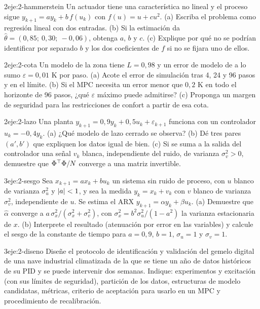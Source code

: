 \begin{ejercicio}{2}{eje:2-hammerstein}
Un actuador tiene una característica no lineal y el proceso sigue $y_{k+1}=ay_k+b\,f(u_k)$ con $f(u)=u+cu^{2}$. (a) Escriba el problema como regresión lineal con dos entradas. (b) Si la estimación da $\hat\theta=(0{,}85;\ 0{,}30;\ -0{,}06)$, obtenga $a$, $b$ y $c$. (c) Explique por qué no se podrían identificar por separado $b$ y los dos coeficientes de $f$ si no se fijara uno de ellos.
\end{ejercicio}

\begin{ejercicio}{2}{eje:2-cota}
Un modelo de la zona tiene $L=0{,}98$ y un error de modelo de a lo sumo $\varepsilon=0{,}01$ K por paso. (a) Acote el error de simulación tras 4, 24 y 96 pasos y en el límite. (b) Si el MPC necesita un error menor que $0{,}2$ K en todo el horizonte de 96 pasos, ¿qué $\varepsilon$ máximo puede admitirse? (c) Proponga un margen de seguridad para las restricciones de confort a partir de esa cota.
\end{ejercicio}

\begin{ejercicio}{2}{eje:2-lazo}
Una planta $y_{k+1}=0{,}9y_k+0{,}5u_k+\varepsilon_{k+1}$ funciona con un controlador $u_k=-0{,}4y_k$. (a) ¿Qué modelo de lazo cerrado se observa? (b) Dé tres pares $(a',b')$ que expliquen los datos igual de bien. (c) Si se suma a la salida del controlador una señal $v_k$ blanca, independiente del ruido, de varianza $\sigma_v^{2}>0$, demuestre que $\Phi^{\top}\Phi/N$ converge a una matriz invertible.
\end{ejercicio}

\begin{ejercicio}{3}{eje:2-sesgo}
Sea $x_{k+1}=ax_k+bu_k$ un sistema sin ruido de proceso, con $u$ blanco de varianza $\sigma_u^{2}$ y $\lvert a\rvert<1$, y sea la medida $y_k=x_k+v_k$ con $v$ blanco de varianza $\sigma_v^{2}$, independiente de $u$. Se estima el ARX $y_{k+1}=\alpha y_k+\beta u_k$. (a) Demuestre que $\hat\alpha$ converge a $a\,\sigma_x^{2}/(\sigma_x^{2}+\sigma_v^{2})$, con $\sigma_x^{2}=b^{2}\sigma_u^{2}/(1-a^{2})$ la varianza estacionaria de $x$. (b) Interprete el resultado (atenuación por error en las variables) y calcule el sesgo de la constante de tiempo para $a=0{,}9$, $b=1$, $\sigma_u=1$ y $\sigma_v=1$.
\end{ejercicio}

\begin{ejercicio}{3}{eje:2-diseno}
Diseñe el protocolo de identificación y validación del gemelo digital de una nave industrial climatizada de la que se tiene un año de datos históricos de su PID y se puede intervenir dos semanas. Indique: experimentos y excitación (con sus límites de seguridad), partición de los datos, estructuras de modelo candidatas, métricas, criterio de aceptación para usarlo en un MPC y procedimiento de recalibración.
\end{ejercicio}
